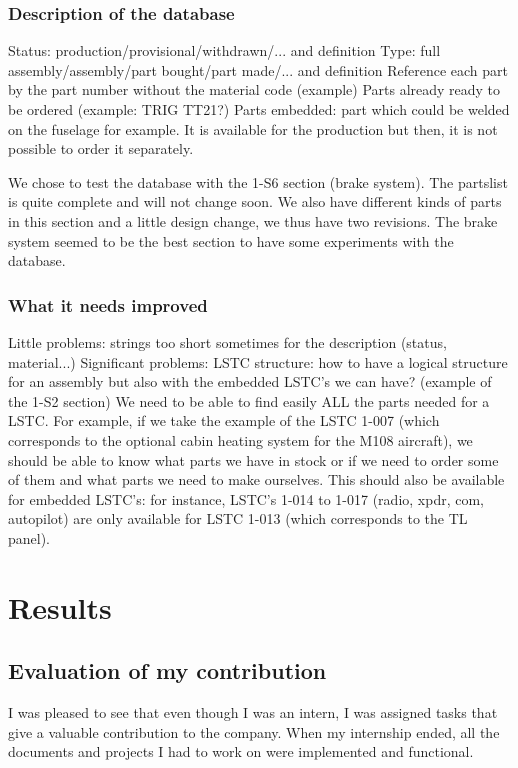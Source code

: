 \documentclass[11pt,a4paper]{report}
\begin{document}
\subsubsection{Description of the database}
Status: production/provisional/withdrawn/... and definition
Type: full assembly/assembly/part bought/part made/... and definition
Reference each part by the part number without the material code (example)
Parts already ready to be ordered (example: TRIG TT21?)
Parts embedded: part which could be welded on the fuselage for example. It is available for the production but then, it is not possible to order it separately.

We chose to test the database with the 1-S6 section (brake system). The partslist is quite complete and will not change soon. We also have different kinds of parts in this section and a little design change, we thus have two revisions. The brake system seemed to be the best section to have some experiments with the database.

\subsubsection{What it needs improved}
Little problems: strings too short sometimes for the description (status, material...)
Significant problems: LSTC structure: how to have a logical structure for an assembly but also with the embedded LSTC's we can have? (example of the 1-S2 section)
We need to be able to find easily ALL the parts needed for a LSTC. For example, if we take the example of the LSTC 1-007 (which corresponds to the optional cabin heating system for the M108 aircraft), we should be able to know what parts we have in stock or if we need to order some of them and what parts we need to make ourselves.
This should also be available for embedded LSTC's: for instance, LSTC's 1-014 to 1-017 (radio, xpdr, com, autopilot) are only available for LSTC 1-013 (which corresponds to the TL panel).


\newpage

\section{Results}
\subsection{Evaluation of my contribution}
 I was pleased to see that even though I was an intern, I was assigned tasks that give a valuable contribution to the company. When my internship ended, all the documents and projects I had to work on were implemented and functional.
\end{document}

